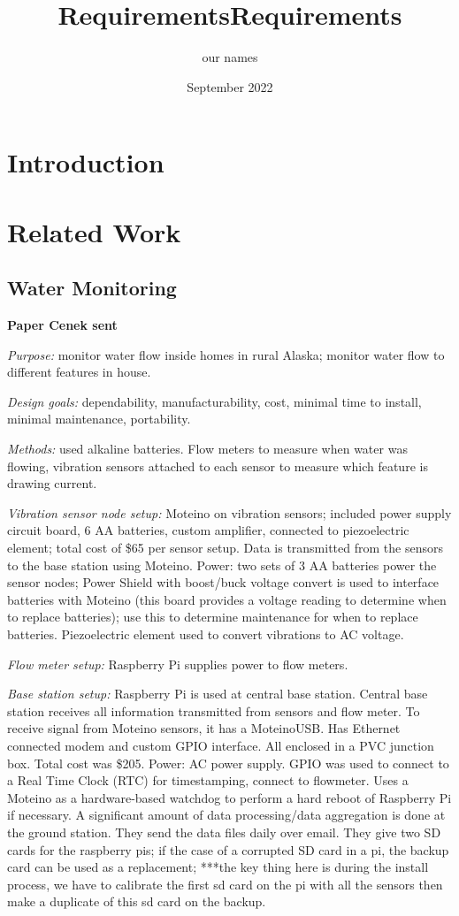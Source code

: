 \documentclass[12pt, letterpaper]{article}
\title{Requirements}
\author{our names}
\date{September 2022}
\begin{document}
\maketitle
\pagestyle{plain}

\title{Requirements}

\section{Introduction}

\section{Related Work}
\subsection{Water Monitoring}
\textbf{Paper Cenek sent}
%

\textit{Purpose:} monitor water flow inside homes in rural Alaska; monitor water flow to different features in house.
%

\textit{Design goals:} dependability, manufacturability, cost, minimal time to install, minimal maintenance, portability.
%

\textit{Methods:} used alkaline batteries. Flow meters to measure when water was flowing, vibration sensors attached to each
sensor to measure which feature is drawing current.
%

\textit{Vibration sensor node setup:} Moteino on vibration sensors; included power supply circuit board, 6 AA batteries,
custom amplifier, connected to piezoelectric element; total cost of \$65 per sensor setup. Data is transmitted from
the sensors to the base station using Moteino.
%
Power: two sets of 3 AA batteries power the sensor nodes; Power Shield with boost/buck voltage convert is used
to interface batteries with Moteino (this board provides a voltage reading to determine when to replace batteries);
use this to determine maintenance for when to replace batteries.
%
Piezoelectric element used to convert vibrations to AC voltage.

\textit{Flow meter setup:} Raspberry Pi supplies power to flow meters.
%

\textit{Base station setup:} Raspberry Pi is used at central base station.
%
Central base station receives all information transmitted from sensors and flow meter.
%
To receive signal from Moteino sensors, it has a MoteinoUSB.
%
Has Ethernet connected modem and custom GPIO interface.
%
All enclosed in a PVC junction box.
%
Total cost was \$205.
%
Power: AC power supply.
%
GPIO was used to connect to a Real Time Clock (RTC) for timestamping, connect to flowmeter.
%
Uses a Moteino as a hardware-based watchdog to perform a hard reboot of Raspberry Pi if necessary.
%
A significant amount of data processing/data aggregation is done at the ground station.
%
They send the data files daily over email.
%
They give two SD cards for the raspberry pis; if the case of a corrupted SD card in a pi, the backup
card can be used as a replacement; ***the key thing here is during the install process, we have to
calibrate the first sd card on the pi with all the sensors then make a duplicate of this sd card
on the backup.
\end{document}
